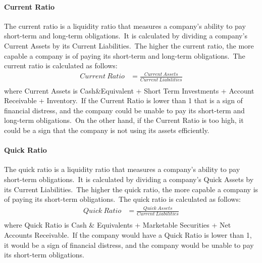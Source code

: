 \documentclass[../xlapes02]{subfiles}
\begin{document}
    \paragraph{Current Ratio}\label{par:current-ratio}
    The current ratio is a liquidity ratio that measures a company's ability to pay short-term and long-term obligations.\ It is calculated by dividing a company's Current Assets by its Current Liabilities.\ The higher the current ratio, the more capable a company is of paying its short-term and long-term obligations.\ The current ratio is calculated as follows:
    \begin{equation}
        \label{eq:current-ratio}
        \begin{split}
            Current\ Ratio&=\frac{Current\ Assets}{Current\ Liabilities}\\
        \end{split}
    \end{equation}
    where Current Assets is Cash\&Equivalent + Short Term Investments + Account Receivable + Inventory.\ If the Current Ratio is lower than 1 that is a sign of financial distress, and the company could be unable to pay its short-term and long-term obligations.\ On the other hand, if the Current Ratio is too high, it could be a sign that the company is not using its assets efficiently.

    \paragraph{Quick Ratio}\label{par:quick-ratio}
    The quick ratio is a liquidity ratio that measures a company's ability to pay short-term obligations.\ It is calculated by dividing a company's Quick Assets by its Current Liabilities.\ The higher the quick ratio, the more capable a company is of paying its short-term obligations.\ The quick ratio is calculated as follows:
    \begin{equation}
        \label{eq:quick-ratio}
        \begin{split}
            Quick\ Ratio&=\frac{Quick\ Assets}{Current\ Liabilities}\\
        \end{split}
    \end{equation}
    where Quick Ratio is Cash \& Equivalents + Marketable Securities + Net Accounts Receivable.\ If the company would have a Quick Ratio is lower than 1, it would be a sign of financial distress, and the company would be unable to pay its short-term obligations.
\end{document}
